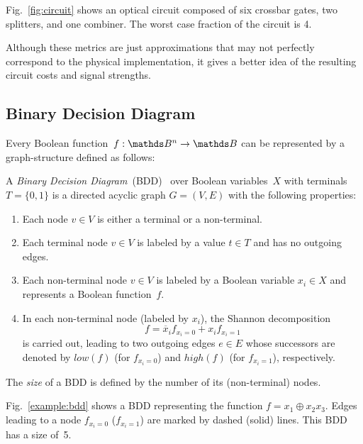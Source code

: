 \documentclass[10pt,letterpaper,twoside,openright]{book}
\begin{document}
\begin{example}
Fig.~\ref{fig:circuit} shows an optical circuit composed of six crossbar gates, two splitters, and
one combiner. The worst case fraction of the circuit is 4.
\end{example}

Although these metrics are just approximations that may not perfectly correspond to the physical
implementation, it gives a better idea of the resulting circuit costs and signal strengths. 

\subsection{Binary Decision Diagram}

Every Boolean function~$f: \B^n \rightarrow \B$ can
be represented by a graph-structure defined as follows:

\begin{definition}
A \emph{Binary Decision Diagram}~(BDD)~\cite{Bryant1986} over Boolean variables~$X$ with terminals $T=\lbrace 0,1\rbrace$ 
is a directed acyclic graph $G=(V,E)$ with the following properties:
\begin{enumerate}
\item Each node $v \in V$ is either a terminal or a non-terminal.
\item Each terminal node $v \in V$ is labeled by a value $t \in T$ and has no outgoing edges.
\item Each non-terminal node $v \in V$ is labeled by a Boolean variable $x_i\in X$ and represents a Boolean function~$f$.
\item In each non-terminal node (labeled by $x_i$), the Shannon decomposition~\cite{Sha:38}
$$f = \overline{x}_if_{x_i=0} + x_if_{x_i=1} $$ %
is carried out, leading to two outgoing edges $e \in E$ whose successors 
are denoted by $low(f)$ (for $f_{x_i=0}$) and $high(f)$ (for $f_{x_i=1}$), respectively.
\end{enumerate}
The \emph{size} of a BDD is defined by the number of its (non-terminal) nodes.
\end{definition}

\begin{example}
Fig.~\ref{example:bdd} shows a BDD representing the function $f=x_1 \oplus x_2x_3$. Edges leading to a node $f_{x_i=0}$ ($f_{x_i=1}$) are marked by dashed (solid) lines.
This BDD has a size of~5.
\end{example}
\end{document}
